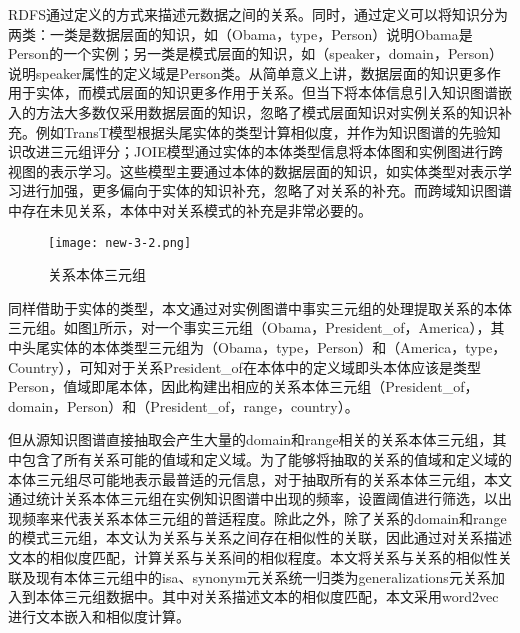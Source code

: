 RDFS通过定义的方式来描述元数据之间的关系。同时，通过定义可以将知识分为两类：一类是数据层面的知识，如（Obama，type，Person）说明Obama是Person的一个实例；另一类是模式层面的知识，如（speaker，domain，Person）说明speaker属性的定义域是Person类。从简单意义上讲，数据层面的知识更多作用于实体，而模式层面的知识更多作用于关系。但当下将本体信息引入知识图谱嵌入的方法大多数仅采用数据层面的知识，忽略了模式层面知识对实例关系的知识补充。例如TransT\cite{ma2017transt}模型根据头尾实体的类型计算相似度，并作为知识图谱的先验知识改进三元组评分；JOIE\cite{hao2019universal}模型通过实体的本体类型信息将本体图和实例图进行跨视图的表示学习。这些模型主要通过本体的数据层面的知识，如实体类型对表示学习进行加强，更多偏向于实体的知识补充，忽略了对关系的补充。而跨域知识图谱中存在未见关系，本体中对关系模式的补充是非常必要的。
\begin{figure}[h]
  \centering
  \texttt{[image: new-3-2.png]}
  \caption{关系本体三元组}
  \label{fig:3-2}
\end{figure}

同样借助于实体的类型，本文通过对实例图谱中事实三元组的处理提取关系的本体三元组。如图\ref{fig:3-2}所示，对一个事实三元组（Obama，President\_of，America），其中头尾实体的本体类型三元组为（Obama，type，Person）和（America，type，Country），可知对于关系President\_of在本体中的定义域即头本体应该是类型Person，值域即尾本体，因此构建出相应的关系本体三元组（President\_of，domain，Person）和（President\_of，range，country）。

但从源知识图谱直接抽取会产生大量的domain和range相关的关系本体三元组，其中包含了所有关系可能的值域和定义域。为了能够将抽取的关系的值域和定义域的本体三元组尽可能地表示最普适的元信息，对于抽取所有的关系本体三元组，本文通过统计关系本体三元组在实例知识图谱中出现的频率，设置阈值进行筛选，以出现频率来代表关系本体三元组的普适程度。除此之外，除了关系的domain和range的模式三元组，本文认为关系与关系之间存在相似性的关联，因此通过对关系描述文本的相似度匹配，计算关系与关系间的相似程度。本文将关系与关系的相似性关联及现有本体三元组中的isa、synonym元关系统一归类为generalizations元关系加入到本体三元组数据中。其中对关系描述文本的相似度匹配，本文采用word2vec进行文本嵌入和相似度计算。

